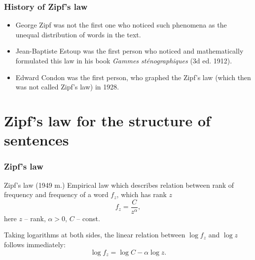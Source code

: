 \documentclass{beamer}
\begin{document}


\begin{frame}
\frametitle{History of Zipf's law}

\begin{itemize}
\item George Zipf was not the first one who noticed such phenomena as the unequal 
distribution of words in the text.
\item Jean-Baptiste Estoup was the first person who noticed and 
mathematically formulated this law in his book \textit{Gammes 
sténographiques} (3d ed. 1912).
\item Edward Condon was the first person, who graphed the Zipf's law (which 
then was not called Zipf's law) in 1928. 
\end{itemize}
\end{frame}



\section{Zipf's law for the structure of sentences}
%
\begin{frame}
\frametitle{Zipf's law}
%
\begin{block}{Zipf's law (1949 m.)}
Empirical law which describes relation between rank of frequency and 
frequency of a word $f_z$, which has rank $z$
%
\begin{equation} \label{f. zipf_nelog}
f_z = \dfrac{C}{z^\alpha},
\end{equation}
here $z$ -- rank, $\alpha > 0$, $C$ -- const.
%
\end{block}
%
%
\begin{block}{}
Taking logarithms at both sides, the linear relation between 
$\log f_z$  and $\log z$ follows immediately:
%
\begin{equation}
\log f_z = \log C - \alpha\log z.
\end{equation}
%
\end{block}
%
%
\end{frame}
\end{document}
